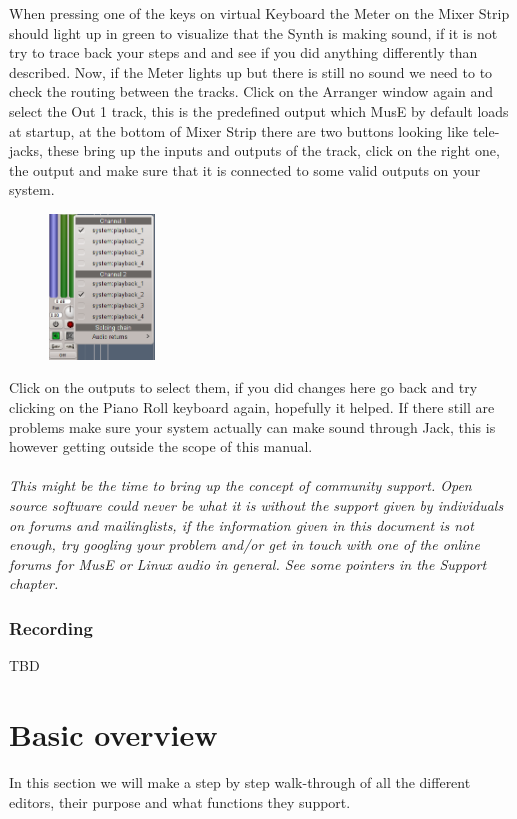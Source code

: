 \documentclass[a4paper]{report}
\begin{document}
When pressing one of the keys on virtual Keyboard the Meter on the Mixer
Strip should light up in green to visualize that the Synth is making
sound, if it is not try to trace back your steps and and see if you did
anything differently than described.
Now, if the Meter lights up but there is still no sound we need to to
check the routing between the tracks. Click on the Arranger window again
and select the Out 1 track, this is the predefined output which MusE by
default loads at startup, at the bottom of Mixer Strip there are two
buttons looking like tele- jacks, these bring up the inputs and outputs
of the track, click on the right one, the output and make sure that it is
connected to some valid outputs on your system.
\begin{figure}
\includegraphics[width=0.25\textwidth]{pics/output_routing}
\end{figure}
Click on the outputs to select them, if you did changes here go back and
try clicking on the Piano Roll keyboard again, hopefully it helped. If there
 still are problems make sure your system actually can make sound through
Jack, this is however getting outside the scope of this manual.\\\\
\textit{This might be the time to bring up the concept of community support.
Open source software could never be what it is without the support given by
individuals on forums and mailinglists, if the information given in this
document is not enough, try googling your problem and/or get in touch with
one of the online forums for MusE or Linux audio in general. See some pointers
in the Support chapter.}

\subsubsection {Recording}                                               %
TBD


\section {Basic overview}
In this section we will make a step by step walk-through of all the
different editors, their purpose and what functions they support.
\end{document}
